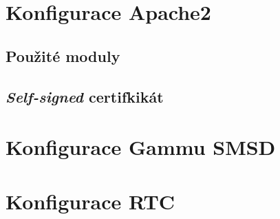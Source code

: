 \section{Konfigurace Apache2}

\subsection{Použité moduly}

\subsection{\textit{Self-signed} certifkikát}

\section{Konfigurace Gammu SMSD}

\section{Konfigurace RTC}